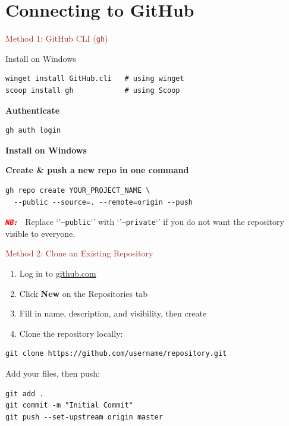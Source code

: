 \section{Connecting to GitHub}

\begin{frame}[fragile]{\textcolor{brown}{Method 1: GitHub CLI (\texttt{gh})}}
\begin{block}{Install on Windows}
\begin{lstlisting}[style=gitcode]
winget install GitHub.cli   # using winget
scoop install gh            # using Scoop
\end{lstlisting}
\end{block}



\begin{block}{\textbf{Authenticate}}
\begin{lstlisting}[style=gitcode]
gh auth login
\end{lstlisting}
\end{block}  \textbf{Install on Windows}


\begin{block} {\textbf{Create \& push a new repo in one command}}
\begin{lstlisting}[style=gitcode]
gh repo create YOUR_PROJECT_NAME \
  --public --source=. --remote=origin --push
\end{lstlisting}
\end{block}


\emph{\texttt{\textbf{\textcolor{red}{NB: }}}} Replace `'\texttt{--public}`' with `'\texttt{--private}`' if you do not want the repository visible to everyone.

\end{frame}

\begin{frame}[fragile]{\textcolor{brown}{Method 2: Clone an Existing Repository}}
  \begin{enumerate}
    \item Log in to \href{https://github.com}{github.com}
    \item Click \textbf{New} on the Repositories tab
    \item Fill in name, description, and visibility, then create
    \item Clone the repository locally:
  \end{enumerate}

\begin{lstlisting}[style=gitcode]
git clone https://github.com/username/repository.git
\end{lstlisting}

  Add your files, then push:
\begin{lstlisting}[style=gitcode]
git add .
git commit -m "Initial Commit"
git push --set-upstream origin master
\end{lstlisting}
\end{frame}

